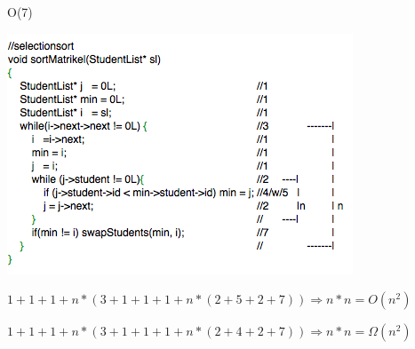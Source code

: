 \documentclass{article}
\begin{document}
O(7)

\includegraphics{selectionsort}

$1+1+1+n*(3+1+1+1+n*(2+5+2+7)) \Rightarrow  n*n = O(n^2)$

$1+1+1+n*(3+1+1+1+n*(2+4+2+7)) \Rightarrow  n*n = \Omega(n^2)$
\end{document}
